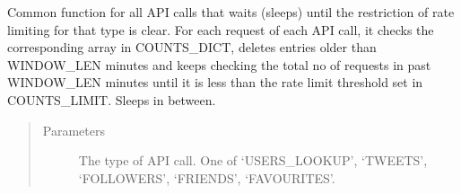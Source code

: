 \documentclass[letterpaper,10pt,english]{sphinxmanual}
\begin{document}
\begin{fulllineitems}
\begin{fulllineitems}
\label{\detokenize{twitter_stream:userstimeline.UserTimelineAPI.wait_for_rate_limit}}
Common function for all API calls that waits (sleeps) until the restriction of rate limiting for that type is clear.
For each request of each API call, it checks the corresponding array in COUNTS\_DICT, deletes entries older than
WINDOW\_LEN minutes and keeps checking the total no of requests in past WINDOW\_LEN minutes until it is less
than the rate limit threshold set in COUNTS\_LIMIT. Sleeps in between.
\begin{quote}\begin{description}
\item[{Parameters}] \leavevmode
{} \textendash{} The type of API call. One of ‘USERS\_LOOKUP’, ‘TWEETS’, ‘FOLLOWERS’, ‘FRIENDS’, ‘FAVOURITES’.

\end{description}\end{quote}

\end{fulllineitems}


\end{fulllineitems}


\begin{fulllineitems}
\label{\detokenize{twitter_stream:userstimeline.extract_hash_tags}}
\end{fulllineitems}


\begin{fulllineitems}
\label{\detokenize{twitter_stream:userstimeline.get_user_screen_names}}
\end{fulllineitems}


\begin{fulllineitems}
\label{\detokenize{twitter_stream:userstimeline.plot_user_field}}
\end{fulllineitems}
\end{document}
